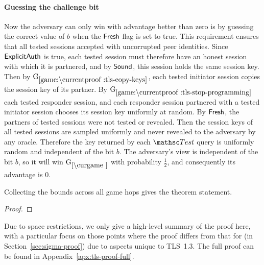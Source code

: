 \begin{collectinmacro}{\TLSProofFull}{}{}
\paragraph{Guessing the challenge bit}
Now the adversary can only win with advantage better than zero is by guessing the correct value of $b$ when the $\mathsf{Fresh}$ flag is set to true. 
This requirement ensures that all tested sessions accepted with uncorrupted peer identities.
Since $\mathsf{ExplicitAuth}$ is true, each tested session must therefore have an honest session with which it is partnered, and by $\mathsf{Sound}$, this session holds the same session key.
Then by $\lblGm{tls-copy-keys}$, each tested initiator session copies the session key of its partner.
By $\lblGm{tls-stop-programming}$ each tested responder session, and each responder session partnered with a tested initiator session chooses its session key uniformly at random.
By $\mathsf{Fresh}$, the partners of tested sessions were not tested or revealed. 
Then the session keys of all tested sessions are sampled uniformly and never revealed to the adversary by any oracle. Therefore the key returned by each $\Test$ query is uniformly random and independent of the bit $b$.
The adversary's view is independent of the bit $b$, so it will win $\curGm$ with probability $\frac{1}{2}$, and consequently its advantage is $0$.

\medskip

Collecting the bounds across all game hops gives the theorem statement.
\end{collectinmacro}

\iffull
\begin{proof}
\TLSProofFull
\end{proof}
\else


Due to space restrictions, we only give a high-level summary of the proof here, with a particular focus on those points where the proof differs from that for \SIGMAI (in Section~\ref{sec:sigma-proof}) due to aspects unique to TLS~1.3.
The full proof can be found in Appendix~\ref{apx:tls-proof-full}.

